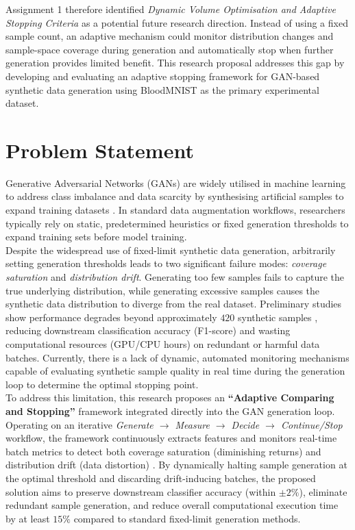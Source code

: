 \documentclass[12pt,a4paper]{report}
\begin{document}
\begin{justify}
Assignment 1 therefore identified \textit{Dynamic Volume Optimisation and Adaptive Stopping Criteria} as a potential future research direction. Instead of using a fixed sample count, an adaptive mechanism could monitor distribution changes and sample-space coverage during generation and automatically stop when further generation provides limited benefit. This research proposal addresses this gap by developing and evaluating an adaptive stopping framework for GAN-based synthetic data generation using BloodMNIST as the primary experimental dataset.

\chapter{Problem Statement}

Generative Adversarial Networks (GANs) are widely utilised in machine learning to address class imbalance and data scarcity by synthesising artificial samples to expand training datasets \parencite{zhu2025novel, li2024improving}. In standard data augmentation workflows, researchers typically rely on static, predetermined heuristics or fixed generation thresholds to expand training sets before model training. \\

Despite the widespread use of fixed-limit synthetic data generation, arbitrarily setting generation thresholds leads to two significant failure modes: \textit{coverage saturation} and \textit{distribution drift}. Generating too few samples fails to capture the true underlying distribution, while generating excessive samples causes the synthetic data distribution to diverge from the real dataset. Preliminary studies show performance degrades beyond approximately $420$ synthetic samples \parencite{zhu2025novel}, reducing downstream classification accuracy (F1-score) and wasting computational resources (GPU/CPU hours) on redundant or harmful data batches. Currently, there is a lack of dynamic, automated monitoring mechanisms capable of evaluating synthetic sample quality in real time during the generation loop to determine the optimal stopping point. \\

To address this limitation, this research proposes an \textbf{``Adaptive Comparing and Stopping''} framework integrated directly into the GAN generation loop. Operating on an iterative \textit{Generate $\rightarrow$ Measure $\rightarrow$ Decide $\rightarrow$ Continue/Stop} workflow, the framework continuously extracts features and monitors real-time batch metrics to detect both coverage saturation (diminishing returns) and distribution drift (data distortion) \parencite{li2024improving}. By dynamically halting sample generation at the optimal threshold and discarding drift-inducing batches, the proposed solution aims to preserve downstream classifier accuracy (within $\pm 2\%$), eliminate redundant sample generation, and reduce overall computational execution time by at least $15\%$ compared to standard fixed-limit generation methods.



\end{justify}
\end{document}
